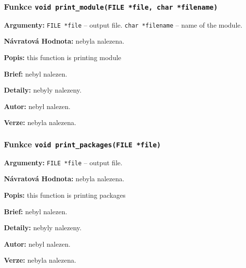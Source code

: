 \documentclass[12pt, a4paper]{article}
\begin{document}
\subsubsection{Funkce \texttt{void print\_module(FILE *file, char *filename)}}
\textbf{Argumenty: }\verb"FILE *file" -- output file. \verb"char *filename" -- name of the module. \\
\par\noindent
\textbf{Návratová Hodnota: }nebyla nalezena.\\
\par\noindent
\textbf{Popis: }this function is printing module\\
\par\noindent
\textbf{Brief: }nebyl nalezen.\\
\par\noindent
\textbf{Detaily: }nebyly nalezeny.\\
\par\noindent
\textbf{Autor: }nebyl nalezen.\\
\par\noindent
\textbf{Verze: }nebyla nalezena.\\
\par\noindent
\subsubsection{Funkce \texttt{void print\_packages(FILE *file)}}
\textbf{Argumenty: }\verb"FILE *file" -- output file. \\
\par\noindent
\textbf{Návratová Hodnota: }nebyla nalezena.\\
\par\noindent
\textbf{Popis: }this function is printing packages\\
\par\noindent
\textbf{Brief: }nebyl nalezen.\\
\par\noindent
\textbf{Detaily: }nebyly nalezeny.\\
\par\noindent
\textbf{Autor: }nebyl nalezen.\\
\par\noindent
\textbf{Verze: }nebyla nalezena.\\
\par\noindent
\end{document}
